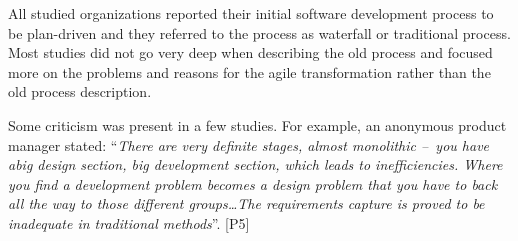 All studied organizations reported their initial software development
process to be plan-driven and they referred to the process as waterfall
or traditional process. Most studies did not go very deep when
describing the old process and focused more on the problems and reasons
for the agile transformation rather than the old process description.

Some criticism was present in a few studies. For example, an anonymous
product manager stated: ``\textit{There are very definite stages, almost
monolithic – you have abig design section, big development section,
which leads to inefficiencies. Where you find a development problem
becomes a design problem that you have to back all the way to those
different groups\ldots The requirements capture is proved to be inadequate
in traditional methods}''. [P5]
